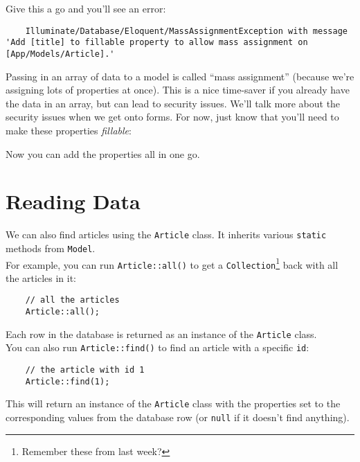 Give this a go and you'll see an error:

\begin{verbatim}
    Illuminate/Database/Eloquent/MassAssignmentException with message 'Add [title] to fillable property to allow mass assignment on [App/Models/Article].'
\end{verbatim}

Passing in an array of data to a model is called ``mass assignment'' (because we're assigning lots of properties at once). This is a nice time-saver if you already have the data in an array, but can lead to security issues. We'll talk more about the security issues when we get onto forms. For now, just know that you'll need to make these properties \textit{fillable}:


Now you can add the properties all in one go.



\section{Reading Data}

We can also find articles using the \texttt{Article} class. It inherits various \texttt{static} methods from \texttt{Model}.
\\

For example, you can run \texttt{Article::all()} to get a \texttt{Collection}\footnote{Remember these from last week?} back with all the articles in it:

\begin{verbatim}
    // all the articles
    Article::all();
\end{verbatim}

Each row in the database is returned as an instance of the \texttt{Article} class.
\\

You can also run \texttt{Article::find()} to find an article with a specific \texttt{id}:

\begin{verbatim}
    // the article with id 1
    Article::find(1);
\end{verbatim}

This will return an instance of the \texttt{Article} class with the properties set to the corresponding values from the database row (or \texttt{null} if it doesn't find anything).
\\


